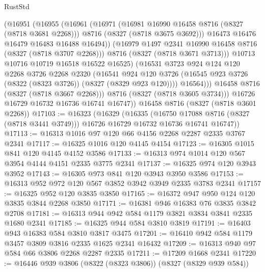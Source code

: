 \begin{lexlean}{RustStd}
\begin{coremodule}
                  (@16951
                    (@16955
                      (@16961
                        (@16971
                          (@16981 @16990 @16458 @8716 (@8327 (@8718 @3681 @2268)))
                          @8716
                          (@8327 (@8718 @3675 @3692)))
                        @16473
                        @16476
                        @16479
                        @16483
                        @16488
                        @16494))
                    (@16979 @1497 @2341 @16990 @16458 @8716 (@8327 (@8718 @3707 @2268)))
                    @8716
                    (@8327 (@8718 @3671 @3713)))
                  @10713
                  @10716
                  @10719
                  @16518
                  @16522
                  @16525)
                (@16531
                  @3723
                  @924
                  @124
                  @120
                  @2268
                  @3726
                  @2268
                  @2320
                  (@16541
                    @924
                    @120
                    @3726
                    (@16545 @923 @3726 (@8322 (@8323 @3726)) (@8327 (@8329 @923 @120))))
                  @16564)))
            @16458
            @8716
            (@8327 (@8718 @3667 @2268)))
          @8716
          (@8327 (@8718 @3605 @3734)))
        @16726
        @16729
        @16732
        @16736
        @16741
        @16747))
    @16458
    @8716
    (@8327 (@8718 @3601 @2268))
@17103 := @16323
    (@16329
      (@16335
        (@16750 @17088 @8716 (@8327 (@8718 @3441 @3749)))
        @16726
        @16729
        @16732
        @16736
        @16741
        @16747))
@17113 := @16313 @1016 @97 @120 @66 @4156 @2268 @2287 @2335 @3767 @2341
@17117 := @16325 @1016 @120 @4145 @4154
@17123 := @16305 @1015 @841 @120 @4145 @4152 @3586
@17133 := @16313 @974 @1014 @120 @567 @3954 @4144 @4151 @2335 @3775 @2341
@17137 := @16325 @974 @120 @3943 @3952
@17143 := @16305 @973 @841 @120 @3943 @3950 @3586
@17153 := @16313 @952 @972 @120 @567 @3852 @3942 @3949 @2335 @3783 @2341
@17157 := @16325 @952 @120 @3835 @3850
@17165 := @16372 @947 @950 @124 @120 @3835 @3844 @2268 @3850
@17171 := @16381 @946 @16383 @76 @3835 @3842 @2708
@17181 := @16313 @944 @942 @584 @1179 @3821 @3834 @3841 @2335 @1680 @2341
@17185 := @16325 @944 @584 @3810 @3819
@17191 := @16403 @943 @16383 @584 @3810 @3817 @3475
@17201 := @16410 @942 @584 @1179 @3457 @3809 @3816 @2335 @1625 @2341 @16432
@17209 := @16313 @940 @97 @584 @66 @3806 @2268 @2287 @2335
@17211 := @17209 @1668 @2341
@17220 := @16446 @939 @3806 (@8322 (@8323 @3806)) (@8327 (@8329 @939 @584))

\end{coremodule}
\end{lexlean}
